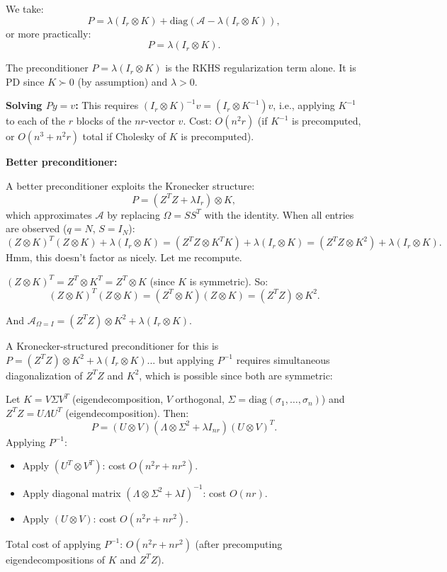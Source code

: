 \documentclass[12pt]{article}
\begin{document}
We take:
\begin{equation}\label{eq:precond}
P = \lambda (I_r \otimes K) + \mathrm{diag}(\mathcal{A} - \lambda(I_r \otimes K)),
\end{equation}
or more practically:
\begin{equation}\label{eq:precond2}
P = \lambda (I_r \otimes K).
\end{equation}

The preconditioner $P = \lambda(I_r \otimes K)$ is the RKHS regularization term alone. It is PD since $K \succ 0$ (by assumption) and $\lambda > 0$.

\textbf{Solving $Py = v$:} This requires $(I_r \otimes K)^{-1} v = (I_r \otimes K^{-1})v$, i.e., applying $K^{-1}$ to each of the $r$ blocks of the $nr$-vector $v$. Cost: $O(n^2 r)$ (if $K^{-1}$ is precomputed, or $O(n^3 + n^2 r)$ total if Cholesky of $K$ is precomputed).

\textbf{Better preconditioner:}

A better preconditioner exploits the Kronecker structure:
\begin{equation}\label{eq:precond-kron}
P = (Z^T Z + \lambda I_r) \otimes K,
\end{equation}
which approximates $\mathcal{A}$ by replacing $\Omega = SS^T$ with the identity. When all entries are observed ($q = N$, $S = I_N$):
\[
(Z \otimes K)^T (Z \otimes K) + \lambda(I_r \otimes K) = (Z^T Z \otimes K^T K) + \lambda(I_r \otimes K) = (Z^T Z \otimes K^2) + \lambda(I_r \otimes K).
\]
Hmm, this doesn't factor as nicely. Let me recompute.

$(Z \otimes K)^T = Z^T \otimes K^T = Z^T \otimes K$ (since $K$ is symmetric). So:
\[
(Z\otimes K)^T(Z\otimes K) = (Z^T \otimes K)(Z \otimes K) = (Z^T Z) \otimes K^2.
\]

And $\mathcal{A}_{\Omega=I} = (Z^T Z) \otimes K^2 + \lambda (I_r \otimes K)$.

A Kronecker-structured preconditioner for this is $P = (Z^T Z) \otimes K^2 + \lambda(I_r \otimes K)$... but applying $P^{-1}$ requires simultaneous diagonalization of $Z^T Z$ and $K^2$, which is possible since both are symmetric:

Let $K = V \Sigma V^T$ (eigendecomposition, $V$ orthogonal, $\Sigma = \mathrm{diag}(\sigma_1,\ldots,\sigma_n)$) and $Z^T Z = U \Lambda U^T$ (eigendecomposition). Then:
\[
P = (U \otimes V)(\Lambda \otimes \Sigma^2 + \lambda I_{nr})(U \otimes V)^T.
\]
Applying $P^{-1}$:
\begin{itemize}
\item Apply $(U^T \otimes V^T)$: cost $O(n^2 r + nr^2)$.
\item Apply diagonal matrix $(\Lambda \otimes \Sigma^2 + \lambda I)^{-1}$: cost $O(nr)$.
\item Apply $(U \otimes V)$: cost $O(n^2 r + nr^2)$.
\end{itemize}
Total cost of applying $P^{-1}$: $O(n^2 r + nr^2)$ (after precomputing eigendecompositions of $K$ and $Z^T Z$).
\end{document}
